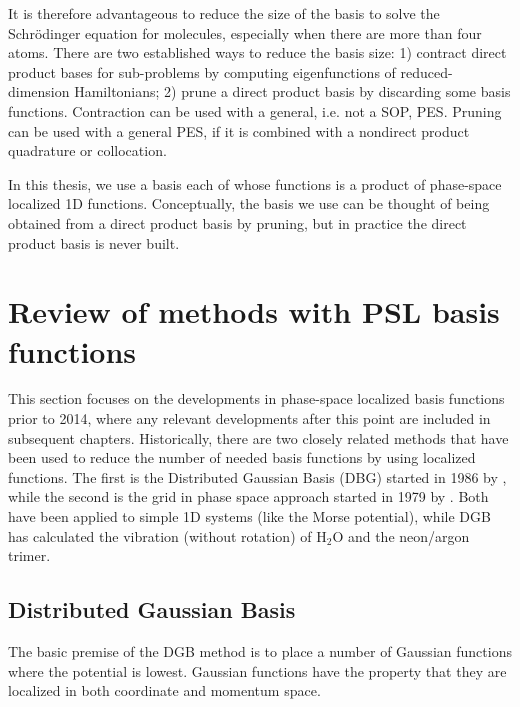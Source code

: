 {It is therefore 
advantageous to reduce the size of the basis to solve the Schr\"{o}dinger 
equation for molecules, especially when there are more than four atoms.\cite{Bowman2008} 
There are two  established ways to reduce the basis size:  1) contract direct product bases for
sub-problems by computing eigenfunctions of reduced-dimension Hamiltonians;\cite{Bacic1989,Carter1988,Henderson1990,Wang2002,Yu2002b} 
  2) prune a direct product basis by discarding some  basis functions.\cite{Carter1986,Carter1997,Poirier2003,Dawes2005,Dawes2006}  
  Contraction can be used
with a general, i.e. not a SOP, PES.   Pruning can be used with a general PES,  if it is combined with a nondirect product quadrature or collocation.\cite{Avila2009,Lauvergnat2010,Avila2011b,Avila2015}

%
In this thesis,    we use a basis each of whose functions is a product of phase-space localized 
1D functions.    Conceptually, the basis we use can be thought of being obtained from 
a direct product basis by pruning, but in practice the direct product basis is never built.   



\section{Review of methods with PSL basis functions}
 This section focuses on the developments in phase-space localized basis functions prior to 2014, where any relevant developments after this point are included in subsequent chapters. 
 Historically, there are two closely related methods 
that have been used to reduce the number of needed basis functions by using localized functions. The first is the 
Distributed Gaussian Basis (DBG) started in 1986 by , while the second is the grid in phase space approach started in 1979 by . Both have been 
applied to simple 1D systems (like the Morse potential), while DGB has calculated the vibration (without 
rotation) of H$_2$O and the neon/argon trimer\cite{Garashchuk2001}. 

\subsection{Distributed Gaussian Basis}
The basic premise of the DGB method is to place a number of Gaussian functions where the potential is lowest.  Gaussian functions have the property that they are localized in both  coordinate and momentum space.  

}
